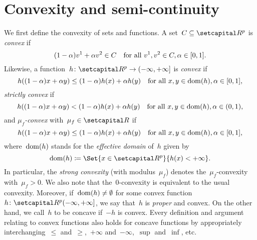 \documentclass[../main]{subfiles}
\begin{document}
\section{Convexity and semi-continuity} 
We first define the convexity of sets and functions.
A set~$C \subseteq \setR^p$ is \emph{convex} if
\begin{equation}
    (1 - \alpha) v^1 + \alpha v^2 \in C \quad \text{for all~$v^1, v^2 \in C, \alpha \in [0, 1]$}
.\end{equation} 
Likewise, a function~$h \colon \setR^p \to (-\infty, +\infty]$ is \emph{convex} if
\begin{equation}
    h((1 - \alpha) x + \alpha y) \le (1 - \alpha) h(x) + \alpha h(y) \quad \text{for all~$x, y \in \operatorname{dom}(h), \alpha \in [0, 1]$}
,\end{equation}
\emph{strictly convex} if
\begin{equation}
    h((1 - \alpha) x + \alpha y) < (1 - \alpha) h(x) + \alpha h(y) \quad \text{for all~$x, y \in \operatorname{dom}(h), \alpha \in (0, 1)$}
,\end{equation} 
and \emph{$\mu_f$-convex} with~$\mu_f \in \setR$ if
\begin{equation}
    h((1 - \alpha) x + \alpha y) \le (1 - \alpha) h(x) + \alpha h(y) \quad \text{for all~$x, y \in \operatorname{dom}(h), \alpha \in [0, 1]$}
,\end{equation} 
where~$\operatorname{dom}(h)$ stands for the \emph{effective domain} of~$h$ given by
\begin{equation}
    \dom(h) \coloneqq \Set{x \in \setR^p}{h(x) < + \infty}
.\end{equation} 
In particular, the \emph{strong convexity} (with modulus~$\mu_f$) denotes the~$\mu_f$-convexity with~$\mu_f > 0$.
We also note that the~$0$-convexity is equivalent to the usual convexity.
Moreover, if~$\operatorname{dom}(h) \neq \emptyset$ for some convex function~$h \colon \setR^p (- \infty, + \infty]$, we say that~$h$ is \emph{proper} and convex.
On the other hand, we call~$h$ to be concave if~$- h$ is convex.
Every definition and argument relating to convex functions also holds for concave functions by appropriately interchanging~$\le$ and~$\ge$,~$+ \infty$ and~$- \infty$,~$\sup$ and~$\inf$, etc.
\end{document}
